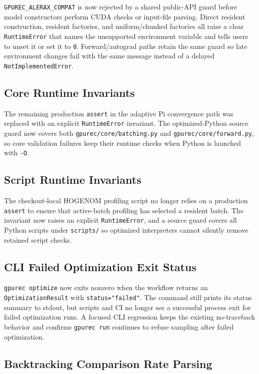 \documentclass[11pt]{article}
\begin{document}
\texttt{GPUREC\_ALERAX\_COMPAT} is now rejected by a shared public-API guard
before model constructors perform CUDA checks or input-file parsing.  Direct
resident construction, resident factories, and uniform/chunked factories all
raise a clear \texttt{RuntimeError} that names the unsupported environment
variable and tells users to unset it or set it to \texttt{0}.  Forward/autograd
paths retain the same guard so late environment changes fail with the same
message instead of a delayed \texttt{NotImplementedError}.

\subsection{Core Runtime Invariants}

The remaining production \texttt{assert} in the adaptive Pi convergence path
was replaced with an explicit \texttt{RuntimeError} invariant.  The
optimized-Python source guard now covers both \texttt{gpurec/core/batching.py}
and \texttt{gpurec/core/forward.py}, so core validation failures keep their
runtime checks when Python is launched with \texttt{-O}.

\subsection{Script Runtime Invariants}

The checkout-local HOGENOM profiling script no longer relies on a production
\texttt{assert} to ensure that active-batch profiling has selected a resident
batch.  The invariant now raises an explicit \texttt{RuntimeError}, and a
source guard covers all Python scripts under \texttt{scripts/} so optimized
interpreters cannot silently remove retained script checks.

\subsection{CLI Failed Optimization Exit Status}

\texttt{gpurec optimize} now exits nonzero when the workflow returns an
\texttt{OptimizationResult} with \texttt{status="failed"}.  The command still
prints its status summary to stdout, but scripts and CI no longer see a
successful process exit for failed optimization runs.  A focused CLI regression
keeps the existing no-traceback behavior and confirms \texttt{gpurec run}
continues to refuse sampling after failed optimization.

\subsection{Backtracking Comparison Rate Parsing}
\end{document}
